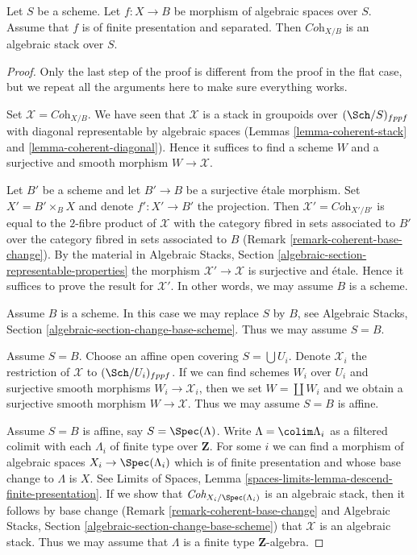 \begin{theorem}
\label{theorem-coherent-algebraic-general}
Let $S$ be a scheme. Let $f : X \to B$ be morphism of algebraic spaces
over $S$. Assume that $f$ is of finite presentation and separated. Then
$\textit{Coh}_{X/B}$ is an algebraic stack over $S$.
\end{theorem}

\begin{proof}
Only the last step of the proof is different from the proof
in the flat case, but we repeat all the arguments here to make 
sure everything works.

\medskip\noindent
Set $\mathcal{X} = \textit{Coh}_{X/B}$. We have seen that $\mathcal{X}$
is a stack in groupoids over $(\Sch/S)_{fppf}$ with diagonal representable
by algebraic spaces
(Lemmas \ref{lemma-coherent-stack} and \ref{lemma-coherent-diagonal}).
Hence it suffices to find a scheme $W$ and a surjective and smooth
morphism $W \to \mathcal{X}$.

\medskip\noindent
Let $B'$ be a scheme and let $B' \to B$ be a surjective \'etale morphism.
Set $X' = B' \times_B X$ and denote $f' : X' \to B'$ the projection.
Then $\mathcal{X}' = \textit{Coh}_{X'/B'}$ is equal to the $2$-fibre
product of $\mathcal{X}$ with the category fibred in sets
associated to $B'$ over the category fibred in sets associated to $B$
(Remark \ref{remark-coherent-base-change}). By the material in
Algebraic Stacks, Section \ref{algebraic-section-representable-properties}
the morphism $\mathcal{X}' \to \mathcal{X}$ is surjective and \'etale.
Hence it suffices to prove the result for $\mathcal{X}'$.
In other words, we may assume $B$ is a scheme.

\medskip\noindent
Assume $B$ is a scheme. In this case we may replace $S$ by $B$, see
Algebraic Stacks, Section \ref{algebraic-section-change-base-scheme}.
Thus we may assume $S = B$.

\medskip\noindent
Assume $S = B$. Choose an affine open covering $S = \bigcup U_i$.
Denote $\mathcal{X}_i$ the restriction of $\mathcal{X}$ to
$(\Sch/U_i)_{fppf}$. If we can find schemes $W_i$ over $U_i$ and
surjective smooth morphisms $W_i \to \mathcal{X}_i$, then we
set $W = \coprod W_i$ and we obtain a surjective smooth morphism
$W \to \mathcal{X}$. Thus we may assume $S = B$ is affine.

\medskip\noindent
Assume $S = B$ is affine, say $S = \Spec(\Lambda)$.
Write $\Lambda = \colim \Lambda_i$ as a filtered colimit with each $\Lambda_i$
of finite type over $\mathbf{Z}$. For some $i$ we can find
a morphism of algebraic spaces $X_i \to \Spec(\Lambda_i)$
which is of finite presentation and whose base change
to $\Lambda$ is $X$. See Limits of Spaces, Lemma
\ref{spaces-limits-lemma-descend-finite-presentation}.
If we show that $\textit{Coh}_{X_i/\Spec(\Lambda_i)}$ is an
algebraic stack, then it follows by base change
(Remark \ref{remark-coherent-base-change} and
Algebraic Stacks, Section \ref{algebraic-section-change-base-scheme})
that $\mathcal{X}$ is an algebraic stack.
Thus we may assume that $\Lambda$ is a finite type $\mathbf{Z}$-algebra.


\end{proof}
